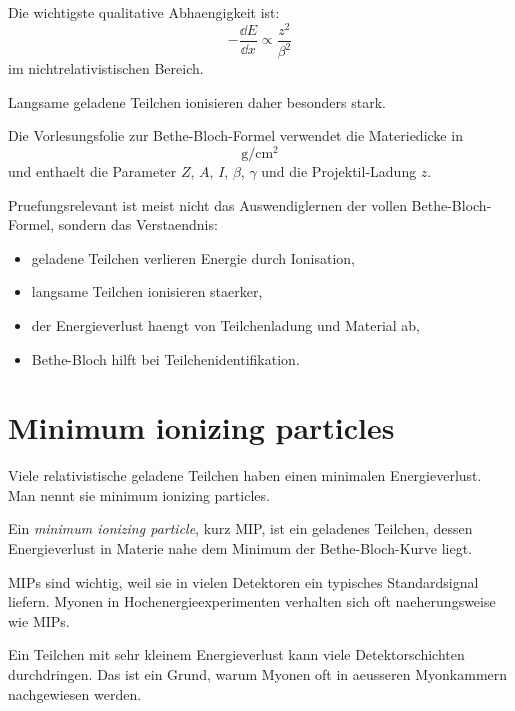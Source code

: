 \begin{conceptbox}
Die wichtigste qualitative Abhaengigkeit ist:
\[
    -\frac{\dd E}{\dd x}
    \propto
    \frac{z^2}{\beta^2}
\]
im nichtrelativistischen Bereich.

Langsame geladene Teilchen ionisieren daher besonders stark.
\end{conceptbox}

\begin{notebox}
Die Vorlesungsfolie zur Bethe-Bloch-Formel verwendet die Materiedicke in
\[
    \mathrm{g/cm^2}
\]
und enthaelt die Parameter $Z$, $A$, $I$, $\beta$, $\gamma$ und die Projektil-Ladung
$z$.
\end{notebox}

\begin{examtipbox}
Pruefungsrelevant ist meist nicht das Auswendiglernen der vollen Bethe-Bloch-Formel,
sondern das Verstaendnis:
\begin{itemize}
    \item geladene Teilchen verlieren Energie durch Ionisation,
    \item langsame Teilchen ionisieren staerker,
    \item der Energieverlust haengt von Teilchenladung und Material ab,
    \item Bethe-Bloch hilft bei Teilchenidentifikation.
\end{itemize}
\end{examtipbox}

\section{Minimum ionizing particles}

Viele relativistische geladene Teilchen haben einen minimalen Energieverlust.
Man nennt sie minimum ionizing particles.

\begin{definitionbox}
Ein \emph{minimum ionizing particle}, kurz MIP, ist ein geladenes Teilchen, dessen
Energieverlust in Materie nahe dem Minimum der Bethe-Bloch-Kurve liegt.
\end{definitionbox}

\begin{conceptbox}
MIPs sind wichtig, weil sie in vielen Detektoren ein typisches Standardsignal liefern.
Myonen in Hochenergieexperimenten verhalten sich oft naeherungsweise wie MIPs.
\end{conceptbox}

\begin{notebox}
Ein Teilchen mit sehr kleinem Energieverlust kann viele Detektorschichten durchdringen.
Das ist ein Grund, warum Myonen oft in aeusseren Myonkammern nachgewiesen werden.
\end{notebox}

